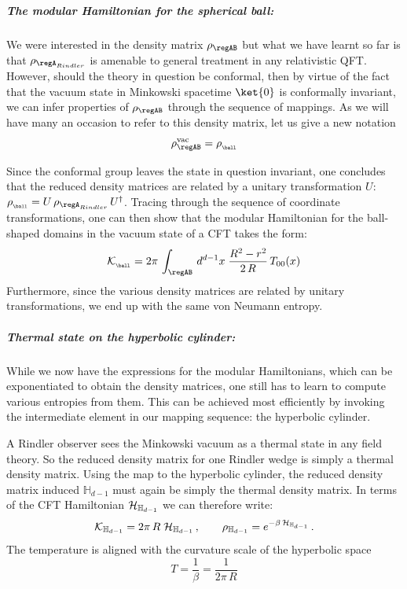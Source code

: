 \documentclass[12pt,openany]{book}
\begin{document}
\subparagraph{The modular Hamiltonian for the spherical ball:} We were interested in the density matrix $\rho_{\regAB}$ but what we have learnt so far is that $\rho_{\regA_{Rindler}}$ is amenable to general treatment in any relativistic QFT. However, should the theory in question be conformal, then by virtue of the fact that the vacuum state in Minkowski spacetime $\ket{0}$ is conformally invariant, we can infer properties of $\rho_{\regAB}$ through the sequence of mappings. As we will have many an occasion to refer to this density matrix, let us give a new notation
%
\begin{equation}
\rho_{\regAB}^\text{vac} = \rho_{_{\ball}}
\label{}
\end{equation}
%

Since the conformal group leaves the state in question invariant, one concludes that the reduced density matrices are related by a unitary transformation $U$: $\rho_{_{\ball}}= U\, \rho_{\regA_{Rindler}}\, U^\dagger$.  Tracing through the sequence of coordinate transformations, one can then show that
the modular Hamiltonian for the ball-shaped domains in the vacuum state of a CFT takes the form:
%
\begin{equation}
{\cal K}_{_{\ball}}= 2\pi\, \int_{\regAB} \, d^{d-1} x\; \frac{R^2-r^2}{2\,R} \,T_{00}(x)
\label{eq:BallmodH}
\end{equation}
%
Furthermore, since the various density matrices are related by unitary transformations, we end up with the same von Neumann entropy.

\subparagraph{Thermal state on the hyperbolic cylinder:}  While we now have the expressions for the modular Hamiltonians, which can be exponentiated to obtain the density matrices, one still has to learn to compute various entropies from them. This can be achieved most efficiently by invoking the intermediate element in our mapping sequence: the hyperbolic cylinder.

A Rindler observer sees the Minkowski vacuum as a thermal state in any field theory. So the reduced density matrix for one Rindler wedge is simply a thermal density matrix.  Using  the map to the hyperbolic cylinder,  the reduced density matrix induced $\mathbb{H}_{d-1}$ must again be simply the thermal density matrix.  In terms of the CFT Hamiltonian $ {\cal H}_{\mathbb{H}_{d-1}} $ we can therefore write:
%
\begin{equation}
{\cal K}_{\mathbb{H}_{d-1}} =2\pi\, R\; {\cal H}_{\mathbb{H}_{d-1}} \,,
\qquad \rho_{\mathbb{H}_{d-1}} = e^{-\beta\,  {\cal H}_{\mathbb{H}_{d-1}}}\,.
\label{eq:HCmodH}
\end{equation}
%
The  temperature is aligned with the curvature scale of the hyperbolic space
%
\begin{equation}
T = \frac{1}{\beta} =  \frac{1}{2\pi\,R}
\label{eq:hyT}
\end{equation}
%
\end{document}
